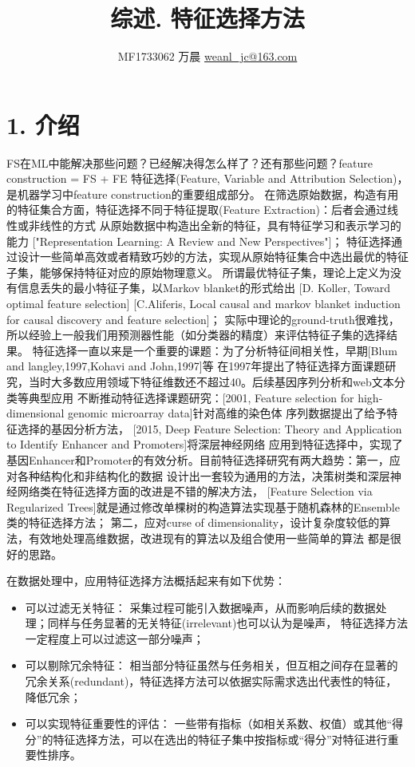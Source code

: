 \documentclass[a4paper,UTF8]{article}
\begin{document}
\title{综述. 特征选择方法}
\author{MF1733062 万晨 \url{weanl_jc@163.com}}
\maketitle

\section*{1. 介绍}
  FS在ML中能解决那些问题？已经解决得怎么样了？还有那些问题？feature construction = FS + FE
  特征选择(Feature, Variable and Attribution Selection)，是机器学习中feature construction的重要组成部分。
  在筛选原始数据，构造有用的特征集合方面，特征选择不同于特征提取(Feature Extraction)：后者会通过线性或非线性的方式
  从原始数据中构造出全新的特征，具有特征学习和表示学习的能力
  ["Representation Learning: A Review and New Perspectives"]；
  特征选择通过设计一些简单高效或者精致巧妙的方法，实现从原始特征集合中选出最优的特征子集，能够保持特征对应的原始物理意义。
  所谓最优特征子集，理论上定义为没有信息丢失的最小特征子集，以Markov blanket的形式给出
  [D. Koller, Toward optimal feature selection]
  [C.Aliferis, Local causal and markov blanket induction for causal discovery and feature selection]；
  实际中理论的ground-truth很难找，所以经验上一般我们用预测器性能（如分类器的精度）来评估特征子集的选择结果。
  特征选择一直以来是一个重要的课题：为了分析特征间相关性，早期[Blum and langley,1997,Kohavi and John,1997]等
  在1997年提出了特征选择方面课题研究，当时大多数应用领域下特征维数还不超过40。后续基因序列分析和web文本分类等典型应用
  不断推动特征选择课题研究：[2001, Feature selection for high-dimensional genomic microarray data]针对高维的染色体
  序列数据提出了给予特征选择的基因分析方法，
  [2015, Deep Feature Selection: Theory and Application to Identify Enhancer and Promoters]将深层神经网络
  应用到特征选择中，实现了基因Enhancer和Promoter的有效分析。目前特征选择研究有两大趋势：第一，应对各种结构化和非结构化的数据
  设计出一套较为通用的方法，决策树类和深层神经网络类在特征选择方面的改进是不错的解决方法，
  [Feature Selection via Regularized Trees]就是通过修改单棵树的构造算法实现基于随机森林的Ensemble类的特征选择方法；
  第二，应对curse of dimensionality，设计复杂度较低的算法，有效地处理高维数据，改进现有的算法以及组合使用一些简单的算法
  都是很好的思路。

  在数据处理中，应用特征选择方法概括起来有如下优势：
  \begin{itemize}
    \item 可以过滤无关特征：
    采集过程可能引入数据噪声，从而影响后续的数据处理；同样与任务显著的无关特征(irrelevant)也可以认为是噪声，
    特征选择方法一定程度上可以过滤这一部分噪声；

    \item 可以剔除冗余特征：
    相当部分特征虽然与任务相关，但互相之间存在显著的冗余关系(redundant)，特征选择方法可以依据实际需求选出代表性的特征，
    降低冗余；

    \item 可以实现特征重要性的评估：
    一些带有指标（如相关系数、权值）或其他“得分”的特征选择方法，可以在选出的特征子集中按指标或“得分”对特征进行重要性排序。

  \end{itemize}
\end{document}
